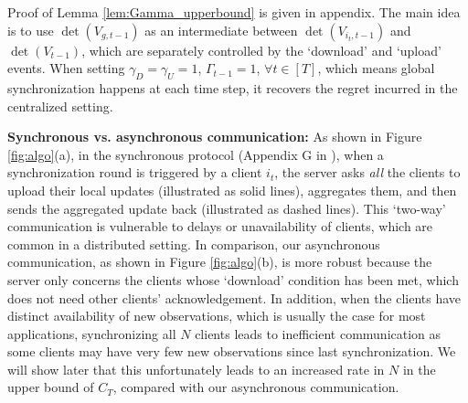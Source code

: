 Proof of Lemma \ref{lem:Gamma_upperbound} is given in appendix. The main idea is to use $\det(V_{g,t-1})$ as an intermediate between $\det(V_{i_{t},t-1})$ and $\det(V_{t-1})$, which are separately controlled by the `download' and `upload' events. When setting $\gamma_{D}=\gamma_{U}=1$, $\Gamma_{t-1}=1$, $\forall t \in [T]$, which means global synchronization happens at each time step, it recovers the regret incurred in the centralized setting.

\noindent \textbf{Synchronous vs. asynchronous communication:}
As shown in Figure \ref{fig:algo}(a), in the synchronous protocol (Appendix G in \citep{wang2019distributed}), when a synchronization round is triggered by a client $i_{t}$, the server asks \emph{all} the clients to upload their local updates (illustrated as solid lines), aggregates them, and then sends the aggregated update back (illustrated as dashed lines). This `two-way' communication is vulnerable to delays or unavailability of clients, which are common in a distributed setting.
In comparison, our asynchronous communication, as shown in Figure \ref{fig:algo}(b), is more robust because the server only concerns the clients whose `download' condition has been met, which does not need other clients' acknowledgement. 
In addition, when the clients have distinct availability of new observations, which is usually the case for most applications, synchronizing all $N$ clients leads to inefficient communication as some clients may have very few new observations since last synchronization. We will show later that this unfortunately leads to an increased rate in $N$ in the upper bound of $C_{T}$, compared with our asynchronous communication.

